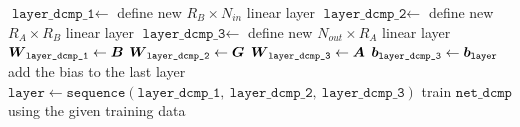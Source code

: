 \begin{algorithm}
\begin{algorithmic}[1]
        \State $\texttt{layer\_dcmp\_1} \leftarrow $ define new $R_B \times N_{in}$ linear layer 
        \State $\texttt{layer\_dcmp\_2} \leftarrow $ define new $R_A \times R_B$ linear layer 
        \State $\texttt{layer\_dcmp\_3} \leftarrow $ define new $N_{out} \times R_A$ linear layer 
        \State $\boldsymbol{W}_{\texttt{layer\_dcmp\_1}} \leftarrow \boldsymbol{B}$ 
        \State $\boldsymbol{W}_{\texttt{layer\_dcmp\_2}} \leftarrow \boldsymbol{G}$
        \State $\boldsymbol{W}_{\texttt{layer\_dcmp\_3}} \leftarrow \boldsymbol{A}$ 
        \State $\boldsymbol{b}_{\texttt{layer\_dcmp\_3}} \leftarrow \boldsymbol{b}_{\texttt{layer}}$ add the bias to the last layer 
        \State $\texttt{layer} \leftarrow \texttt{sequence}(\texttt{layer\_dcmp\_1}, \ \texttt{layer\_dcmp\_2}, \ \texttt{layer\_dcmp\_3})$
    \EndFor
    \State train $\texttt{net\_dcmp}$ using the given training data 
\end{algorithmic}
\end{algorithm}